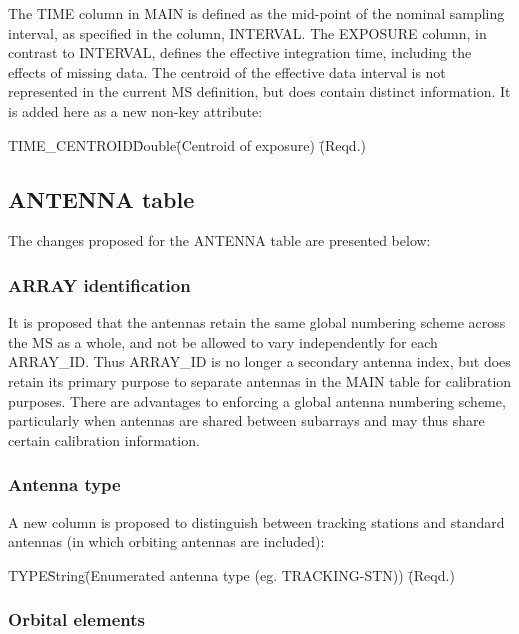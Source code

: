 \documentclass{article}
\begin{document}
The TIME column in MAIN is defined as the mid-point of the nominal
sampling interval, as specified in the column, INTERVAL. The EXPOSURE
column, in contrast to INTERVAL, defines the effective integration
time, including the effects of missing data. The centroid of the
effective data interval is not represented in the current MS
definition, but does contain distinct information. It is added here as
a new non-key attribute:

\begin{tabbing}
TIME\_CENTROID\quad\quad \= Double\quad\quad \= (Centroid of
exposure) \quad\quad \= (Reqd.) \\
\end{tabbing}

\subsection{ANTENNA table}

The changes proposed for the ANTENNA table are presented below:

\subsubsection{ARRAY identification}

It is proposed that the antennas retain the same global numbering
scheme across the MS as a whole, and not be allowed to vary
independently for each ARRAY\_ID. Thus ARRAY\_ID is no longer a
secondary antenna index, but does retain its primary purpose to separate
antennas in the MAIN table for calibration purposes. There are
advantages to enforcing a global antenna numbering scheme,
particularly when antennas are shared between subarrays and may thus
share certain calibration information.

\subsubsection{Antenna type}

A new column is proposed to distinguish between tracking stations and
standard antennas (in which orbiting antennas are included):

\begin{tabbing}
TYPE\quad\quad \= String\quad\quad \= 
(Enumerated antenna type (eg. TRACKING-STN))
 \quad\quad \= (Reqd.) \\
\end{tabbing}

\subsubsection{Orbital elements}
\end{document}
